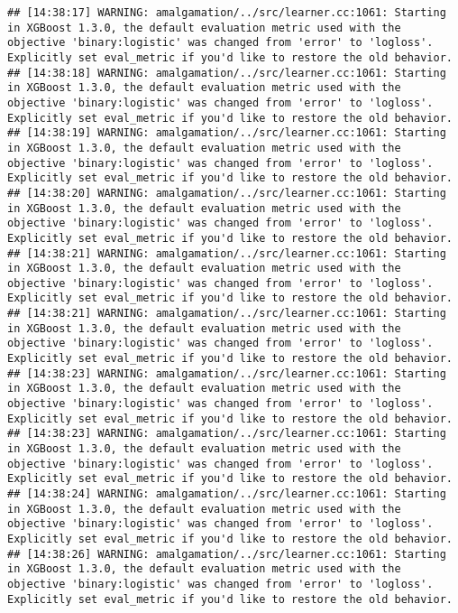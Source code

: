 \documentclass[
]{book}
\begin{document}
\begin{verbatim}
## [14:38:17] WARNING: amalgamation/../src/learner.cc:1061: Starting in XGBoost 1.3.0, the default evaluation metric used with the objective 'binary:logistic' was changed from 'error' to 'logloss'. Explicitly set eval_metric if you'd like to restore the old behavior.
## [14:38:18] WARNING: amalgamation/../src/learner.cc:1061: Starting in XGBoost 1.3.0, the default evaluation metric used with the objective 'binary:logistic' was changed from 'error' to 'logloss'. Explicitly set eval_metric if you'd like to restore the old behavior.
## [14:38:19] WARNING: amalgamation/../src/learner.cc:1061: Starting in XGBoost 1.3.0, the default evaluation metric used with the objective 'binary:logistic' was changed from 'error' to 'logloss'. Explicitly set eval_metric if you'd like to restore the old behavior.
## [14:38:20] WARNING: amalgamation/../src/learner.cc:1061: Starting in XGBoost 1.3.0, the default evaluation metric used with the objective 'binary:logistic' was changed from 'error' to 'logloss'. Explicitly set eval_metric if you'd like to restore the old behavior.
## [14:38:21] WARNING: amalgamation/../src/learner.cc:1061: Starting in XGBoost 1.3.0, the default evaluation metric used with the objective 'binary:logistic' was changed from 'error' to 'logloss'. Explicitly set eval_metric if you'd like to restore the old behavior.
## [14:38:21] WARNING: amalgamation/../src/learner.cc:1061: Starting in XGBoost 1.3.0, the default evaluation metric used with the objective 'binary:logistic' was changed from 'error' to 'logloss'. Explicitly set eval_metric if you'd like to restore the old behavior.
## [14:38:23] WARNING: amalgamation/../src/learner.cc:1061: Starting in XGBoost 1.3.0, the default evaluation metric used with the objective 'binary:logistic' was changed from 'error' to 'logloss'. Explicitly set eval_metric if you'd like to restore the old behavior.
## [14:38:23] WARNING: amalgamation/../src/learner.cc:1061: Starting in XGBoost 1.3.0, the default evaluation metric used with the objective 'binary:logistic' was changed from 'error' to 'logloss'. Explicitly set eval_metric if you'd like to restore the old behavior.
## [14:38:24] WARNING: amalgamation/../src/learner.cc:1061: Starting in XGBoost 1.3.0, the default evaluation metric used with the objective 'binary:logistic' was changed from 'error' to 'logloss'. Explicitly set eval_metric if you'd like to restore the old behavior.
## [14:38:26] WARNING: amalgamation/../src/learner.cc:1061: Starting in XGBoost 1.3.0, the default evaluation metric used with the objective 'binary:logistic' was changed from 'error' to 'logloss'. Explicitly set eval_metric if you'd like to restore the old behavior.

\end{verbatim}
\end{document}
